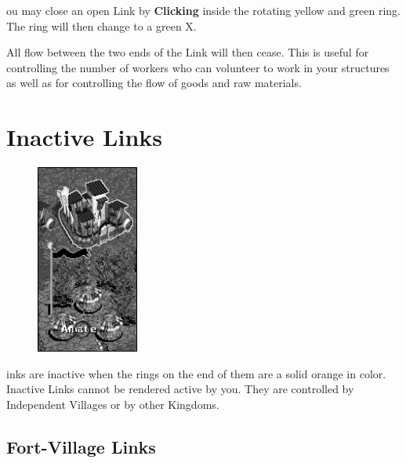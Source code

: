 
ou may close an open Link by \textbf{Clicking} inside the rotating yellow and green ring. The ring will then change to a green X.

All flow between the two ends of the Link will then cease. This is useful for controlling the number of workers who can volunteer to work in your structures as well as for controlling the flow of goods and raw materials.

\section{\textsf{Inactive Links}}



\begin{figure}
    \vspace{-20pt}
    \begin{center}
        \includegraphics[width=0.3\textwidth]{Iinactivelink}
    \end{center}
    \vspace{-50pt}
\end{figure}

inks are inactive when the rings on the end of them are a solid orange in color. Inactive Links cannot be rendered active by you. They are controlled by Independent Villages or by other Kingdoms. 

\subsection{\textsf{Fort-Village Links}}


